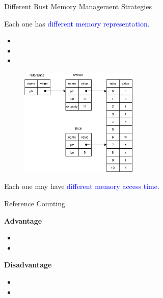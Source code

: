 \documentclass[9pt]{beamer}
\begin{document}
\begin{frame}[fragile]{Different Rust Memory Management Strategies}

    Each one has \textcolor{blue}{different memory representation.}
    \begin{itemize}
        \item {} 
        \item {}
        \item {}
    \end{itemize}

    \pause

    \begin{figure}[hp]
        \centering
        \begin{center}
                \includegraphics[width=0.5\textwidth]{images/own_ref_slice.eps}
                \captionsetup{labelformat=empty}
        \end{center}
    \end{figure}

    Each one may have \textcolor{blue}{different memory access time.}
\end{frame}


\begin{frame}[fragile]{Reference Counting}

    \textbf{Advantage}
    \begin{itemize}
        \item {} 
        \item {}
    \end{itemize}

    \vspace{0.5cm}

    \textbf{Disadvantage}
    \begin{itemize}
        \item {} 
        \item {}
    \end{itemize}


\end{frame}
\end{document}
